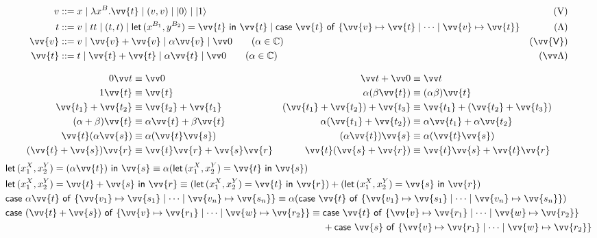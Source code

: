 \documentclass[runningheads,orivec,envcountsame,envcountsect]{llncs}
\newcommand\ket[1]{\ensuremath{|#1\rangle}}
\newcommand\s[1]{\ensuremath{\mathsf{#1}}}
\newcommand\Val{{\s V}}
\DeclareRobustCommand{\ValD}{\ensuremath{\vv{\mathsf{V}}}}
\def\C{\mathbb{C}}            %
\def\Val{\mathrm{V}}          %
\def\Pair#1#2{(#1,#2)} %
\def\Lam#1#2#3{\lambda#1^{#2}{.}#3} %
\def\letkeyword{\mathsf{let}}
\def\inkeyword{\mathsf{in}}
\def\LetP#1#2#3#4#5#6{\letkeyword\,\Pair{#1^{#2}}{#3^{#4}}=#5~\inkeyword~#6}
\def\gencase#1#2#3#4#5{\ensuremath{\mathsf{case}~#1~\mathsf{of}~\{#2\mapsto #4 \mid \dotsb \mid #3\mapsto #5\}}}
\begin{document}
\begin{table}[t]
  \begin{align*}
    v &::= x \mid \Lam{x}B{\vv{t}} \mid (v, v) \mid \ket{0} \mid \ket{1} &
    (\Val)\\
    t &::= v \mid tt \mid (t,t) \mid
    \LetP{x}{B_1}{y}{B_2}{\vv{t}}{\vv{t}}\mid
    \gencase{\vv{t}}{\vv{v}}{\vv{v}}{\vv{t}}{\vv{t}} &
    (\Lambda) \\
    \vv{v} &::= v \mid \vv{v}+\vv{v} \mid \alpha \vv{v} \mid \vv 0
    \qquad\hfill(\alpha\in\C) & (\ValD) \\
    \vv{t} &::= t \mid \vv{t}+\vv{t} \mid \alpha \vv{t} \mid \vv 0
    \qquad\hfill(\alpha\in\C) & (\vv \Lambda)
  \end{align*}
  \caption{Syntax of the calculus, where $B, B_1, B_2 \subseteq \ValD$.}
  \label{tab:Syntax}
\end{table}
\begin{table}[t]
  \begin{align*}
    0\vv t &\equiv \vv 0 & \vv t+\vv 0 &\equiv \vv t \\
    1\vv{t} &\equiv \vv{t} &
    \alpha(\beta\vv{t}) &\equiv (\alpha\beta)\vv{t} \\
    \vv{t_1}+\vv{t_2} &\equiv \vv{t_2}+\vv{t_1} &
    (\vv{t_1}+\vv{t_2})+\vv{t_3} &\equiv \vv{t_1}+(\vv{t_2}+\vv{t_3}) \\
    (\alpha+\beta)\vv{t} &\equiv \alpha\vv{t}+\beta\vv{t} &
    \alpha(\vv{t_1}+\vv{t_2}) &\equiv \alpha\vv{t_1}+\alpha\vv{t_2} \\
    \vv{t}(\alpha\vv{s}) &\equiv \alpha(\vv{t}\vv{s}) &
    (\alpha\vv{t})\vv{s} &\equiv \alpha(\vv{t}\vv{s}) \\
    (\vv{t}+\vv{s})\vv{r} &\equiv \vv{t}\vv{r}+\vv{s}\vv{r} &
    \vv{t}(\vv{s}+\vv{r}) &\equiv \vv{t}\vv{s}+\vv{t}\vv{r} &&
  \end{align*}
  \vspace{-2\baselineskip}
  \begin{align*}
    &\LetP{x_1}{X}{x_2}{Y}{(\alpha\vv{t})}{\vv{s}}
    \equiv \alpha(\LetP{x_1}{X}{x_2}{Y}{\vv{t}}{\vv{s}}) \\
    &\LetP{x_1}{X}{x_2}{Y}{\vv{t}+\vv{s}}{\vv{r}}
    \equiv
      (\LetP{x_1}{X}{x_2}{Y}{\vv{t}}{\vv{r}})
      +(\LetP{x_1}{X}{x_2}{Y}{\vv{s}}{\vv{r}}) 
      \\
    &\gencase{\alpha \vv{t}}{\vv{v_1}}{\vv{v_n}}{\vv{s_1}}{\vv{s_n}}
    \equiv \alpha(\gencase{\vv{t}}{\vv{v_1}}{\vv{v_n}}{\vv{s_1}}{\vv{s_n}}) \\
    &\gencase{(\vv{t}+\vv{s})}{\vv{v}}{\vv{w}}{\vv{r_1}}{\vv{r_2}}
    \equiv\begin{aligned}[t]
      &\gencase{\vv{t}}{\vv{v}}{\vv{w}}{\vv{r_1}}{\vv{r_2}}\\
      &+\gencase{\vv{s}}{\vv{v}}{\vv{w}}{\vv{r_1}}{\vv{r_2}}
    \end{aligned}
  \end{align*}
  \caption{Term congruence}
  \label{tab:Congruence}
\end{table}
\end{document}
